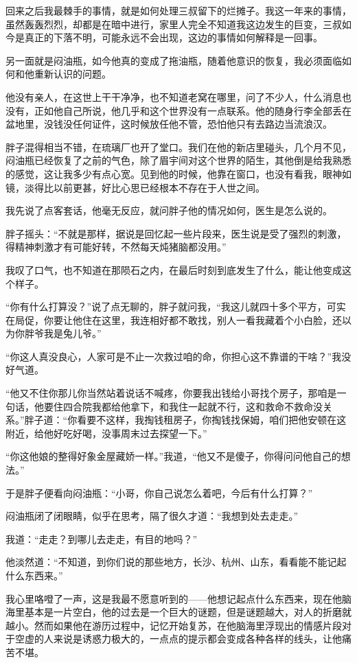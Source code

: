 回来之后我最棘手的事情，就是如何处理三叔留下的烂摊子。我这一年来的事情，虽然轰轰烈烈，却都是在暗中进行，家里人完全不知道我这边发生的巨变，三叔如今是真正的下落不明，可能永远不会出现，这边的事情如何解释是一回事。

另一面就是闷油瓶，如今他真的变成了拖油瓶，随着他意识的恢复，我必须面临如何和他重新认识的问题。

他没有亲人，在这世上干干净净，也不知道老窝在哪里，问了不少人，什么消息也没有，正如他自己所说，他几乎和这个世界没有一点联系。他的随身行李全部丢在盆地里，没钱没任何证件，这时候放任他不管，恐怕他只有去路边当流浪汉。

胖子混得相当不错，在琉璃厂也开了堂口。我们在他的新店里碰头，几个月不见，闷油瓶已经恢复了之前的气色，除了眉宇间对这个世界的陌生，其他倒是给我熟悉的感觉，这让我多少有点心宽。见到他的时候，他靠在窗口，也没有看我，眼神如镜，淡得比以前更甚，好比心思已经根本不存在于人世之间。

我先说了点客套话，他毫无反应，就问胖子他的情况如何，医生是怎么说的。

胖子摇头：“不就是那样，据说是回忆起一些片段来，医生说是受了强烈的刺激，得精神刺激才有可能好转，不然每天炖猪脑都没用。”

我叹了口气，也不知道在那陨石之内，在最后时刻到底发生了什么，能让他变成这个样子。

“你有什么打算没？”说了点无聊的，胖子就问我，“我这儿就四十多个平方，可实在局促，你要让他住在这里，我连相好都不敢找，别人一看我藏着个小白脸，还以为你胖爷我是兔儿爷。”

“你这人真没良心，人家可是不止一次救过咱的命，你担心这不靠谱的干啥？”我没好气道。

“他又不住你那儿你当然站着说话不喊疼，你要我出钱给小哥找个房子，那咱是一句话，他要住四合院我都给他拿下，和我住一起就不行，这和救命不救命没关系。”胖子道：“你看要不这样，我掏钱租房子，你掏钱找保姆，咱们把他安顿在这附近，给他好吃好喝，没事周末过去探望一下。”

“你这他娘的整得好象金屋藏娇一样。”我道，“他又不是傻子，你得问问他自己的想法。”

于是胖子便看向闷油瓶：“小哥，你自己说怎么着吧，今后有什么打算？”

闷油瓶闭了闭眼睛，似乎在思考，隔了很久才道：“我想到处去走走。”

我道：“走走？到哪儿去走走，有目的地吗？”

他淡然道：“不知道，到你们说的那些地方，长沙、杭州、山东，看看能不能记起什么东西来。”

我心里咯噔了一声，这是我最不愿意听到的——他想记起点什么东西来，现在他脑海里基本是一片空白，他的过去是一个巨大的谜题，但是谜题越大，对人的折磨就越小。然而如果他在游历过程中，记忆开始复苏，在他脑海里浮现出的情感片段对于空虚的人来说是诱惑力极大的，一点点的提示都会变成各种各样的线头，让他痛苦不堪。


